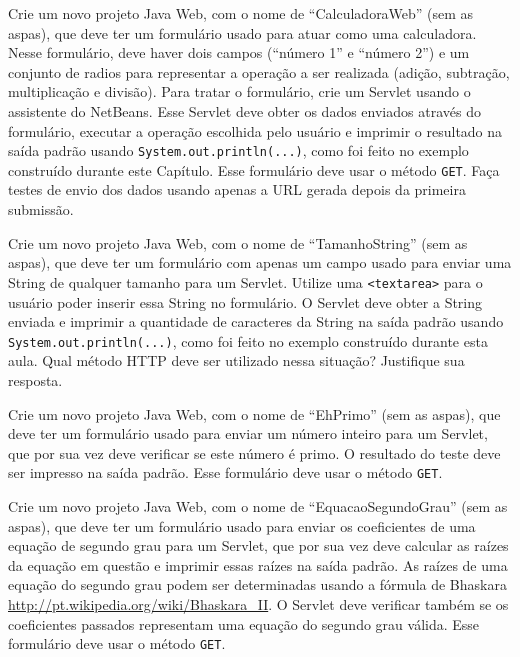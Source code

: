 \begin{projetoSemArquivo}{}{}{}
    Crie um novo projeto Java Web, com o nome de ``CalculadoraWeb'' (sem as aspas), que deve ter um formulário usado para atuar como uma calculadora. Nesse formulário, deve haver dois campos (``número 1'' e ``número 2'') e um conjunto de radios para representar a operação a ser realizada (adição, subtração, multiplicação e divisão). Para tratar o formulário, crie um Servlet usando o assistente do NetBeans. Esse Servlet deve obter os dados enviados através do formulário, executar a operação escolhida pelo usuário e imprimir o resultado na saída padrão usando \texttt{System.out.println(...)}, como foi feito no exemplo construído durante este Capítulo. Esse formulário deve usar o método \texttt{GET}. Faça testes de envio dos dados usando apenas a URL gerada depois da primeira submissão.
\end{projetoSemArquivo}

\begin{projetoSemArquivo}{}{}{}
    Crie um novo projeto Java Web, com o nome de ``TamanhoString'' (sem as aspas), que deve ter um formulário com apenas um campo usado para enviar uma String de qualquer tamanho para um Servlet. Utilize uma \texttt{<textarea>} para o usuário poder inserir essa String no formulário. O Servlet deve obter a String enviada e imprimir a quantidade de caracteres da String na saída padrão usando \texttt{System.out.println(...)}, como foi feito no exemplo construído durante esta aula. Qual método HTTP deve ser utilizado nessa situação? Justifique sua resposta.
\end{projetoSemArquivo}

\begin{projetoSemArquivo}{}{}{}
    Crie um novo projeto Java Web, com o nome de ``EhPrimo'' (sem as aspas), que deve ter um formulário usado para enviar um número inteiro para um Servlet, que por sua vez deve verificar se este número é primo. O resultado do teste deve ser impresso na saída padrão. Esse formulário deve usar o método \texttt{GET}.
\end{projetoSemArquivo}

\begin{projetoSemArquivo}{}{}{}
Crie um novo projeto Java Web, com o nome de ``EquacaoSegundoGrau'' (sem as aspas), que deve ter um formulário usado para enviar os coeficientes de uma equação de segundo grau para um Servlet, que por sua vez deve calcular as raízes da equação em questão e imprimir essas raízes na saída padrão. As raízes de uma equação do segundo grau podem ser determinadas usando a fórmula de Bhaskara \url{http://pt.wikipedia.org/wiki/Bhaskara_II}. O Servlet deve verificar também se os coeficientes passados representam uma equação do segundo grau válida. Esse formulário deve usar o método \texttt{GET}.
\end{projetoSemArquivo}